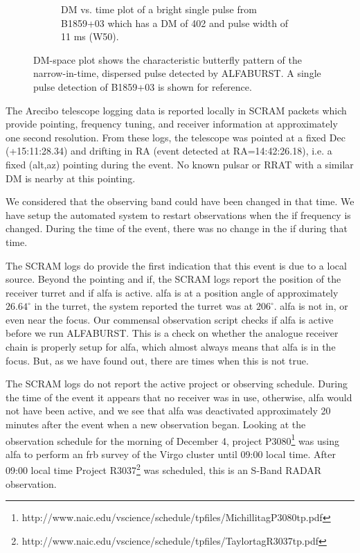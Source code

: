 \documentclass[a4paper,fleqn,usenatbib]{mnras}
\begin{document}
\begin{figure}
\begin{subfigure}[t]{0.5\textwidth}
        \caption{DM vs. time plot of a bright single pulse from B1859+03 which
        has a DM of 402 and pulse width of 11 ms (W50).
        }
        \label{fig:dm_time_B1859}
    \end{subfigure}
    \caption{DM-space plot shows the characteristic butterfly pattern of the
    narrow-in-time, dispersed pulse detected by ALFABURST. A single pulse
    detection of B1859+03 is shown for reference.
    }
    \label{fig:dm_time}
\end{figure}

The Arecibo telescope logging data is reported locally in SCRAM packets which
provide pointing, frequency tuning, and receiver information at approximately
one second resolution. From these logs, the telescope was pointed at a fixed Dec
(+15:11:28.34) and drifting in RA (event detected at RA=14:42:26.18), i.e. a
fixed (alt,az) pointing during the event. No known pulsar or RRAT with a similar
DM is nearby at this pointing.

We considered that the observing band could have been changed in that time.  We
have setup the automated system to restart observations when the \gls{if}
frequency is changed.  During the time of the event, there was no change in the
\gls{if} during that time.

The SCRAM logs do provide the first indication that this event is due to a local
source. Beyond the pointing and \gls{if}, the SCRAM logs report the position of
the receiver turret and if \gls{alfa} is active. \gls{alfa} is at a position
angle of approximately $26.64^{\circ}$ in the turret, the system reported the
turret was at $206^{\circ}$. \gls{alfa} is not in, or even near the focus.  Our
commensal observation script checks if \gls{alfa} is active before we run
ALFABURST. This is a check on whether the analogue receiver chain is properly
setup for \gls{alfa}, which almost always means that \gls{alfa} is in the focus.
But, as we have found out, there are times when this is not true.

The SCRAM logs do not report the active project or observing schedule. During
the time of the event it appears that no receiver was in use, otherwise,
\gls{alfa} would not have been active, and we see that \gls{alfa} was
deactivated approximately 20 minutes after the event when a new observation
began.  Looking at the observation schedule for the morning of December 4,
project
P3080\footnote{http://www.naic.edu/vscience/schedule/tpfiles/MichillitagP3080tp.pdf}
was using \gls{alfa} to perform an \gls{frb} survey of the Virgo cluster until
09:00 local time.  After 09:00 local time Project
R3037\footnote{http://www.naic.edu/vscience/schedule/tpfiles/TaylortagR3037tp.pdf}
was scheduled, this is an S-Band RADAR observation. 
\end{document}
